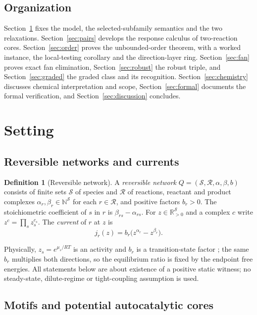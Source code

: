 \documentclass[11pt,a4paper]{article}
\theoremstyle{plain}
\theoremstyle{definition}
\newtheorem{definition}[theorem]{Definition}
\theoremstyle{remark}
\newcommand{\R}{\mathbb{R}}
\newcommand{\N}{\mathbb{N}}
\newcommand{\Rpos}{\R_{>0}}
\newcommand{\cS}{\mathcal{S}}
\newcommand{\cR}{\mathcal{R}}
\begin{document}
\subsection{Organization}

Section~\ref{sec:setting} fixes the model, the selected-subfamily semantics and the two relaxations. Section~\ref{sec:pairs} develops the response calculus of two-reaction cores. Section~\ref{sec:order} proves the unbounded-order theorem, with a worked instance, the local-testing corollary and the direction-layer ring. Section~\ref{sec:fan} proves exact fan elimination, Section~\ref{sec:robust} the robust triple, and Section~\ref{sec:graded} the graded class and its recognition. Section~\ref{sec:chemistry} discusses chemical interpretation and scope, Section~\ref{sec:formal} documents the formal verification, and Section~\ref{sec:discussion} concludes.

\section{Setting}\label{sec:setting}

\subsection{Reversible networks and currents}

\begin{definition}[Reversible network]\label{def:crn}
A \emph{reversible network} $Q=(\cS,\cR,\alpha,\beta,b)$ consists of finite sets $\cS$ of species and $\cR$ of reactions, reactant and product complexes $\alpha_r,\beta_r\in\N^{\cS}$ for each $r\in\cR$, and positive factors $b_r>0$. The stoichiometric coefficient of $s$ in $r$ is $\beta_{rs}-\alpha_{rs}$. For $z\in\Rpos^{\cS}$ and a complex $c$ write $z^{c}=\prod_s z_s^{c_s}$. The \emph{current} of $r$ at $z$ is
\[
j_r(z)=b_r\bigl(z^{\alpha_r}-z^{\beta_r}\bigr).
\]
\end{definition}

Physically, $z_s=e^{\mu_s/RT}$ is an activity and $b_r$ is a transition-state factor \citep{eyring1935,kosc2025}; the same $b_r$ multiplies both directions, so the equilibrium ratio is fixed by the endpoint free energies. All statements below are about existence of a positive static witness; no steady-state, dilute-regime or tight-coupling assumption is used.

\subsection{Motifs and potential autocatalytic cores}
\end{document}
